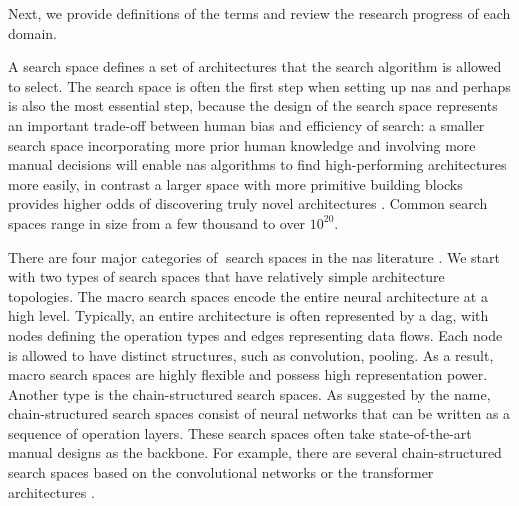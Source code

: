 \documentclass[a4paper,oneside,bibliography=totoc]{scrbook}
\begin{document}
\noindent Next, we provide definitions of the terms and review the research progress of each domain.
\begin{description}[leftmargin=0cm, listparindent=\parindent]
	\item [Search Space] A search space defines a set of architectures that the search algorithm is allowed to select. The search space is often the first step when setting up \gls{nas} and perhaps is also the most essential step, because
		the design of the search space represents an important trade-off between human bias and efficiency of search: a
		smaller search space incorporating more prior human knowledge and involving more manual decisions will enable
		\gls{nas} algorithms to find high-performing architectures more easily, in contrast a larger space with more primitive
		building blocks provides higher odds of discovering truly novel architectures \cite{white2023survey}. Common  search
		spaces range in size from a few thousand to over $10^{20}$.	
	
		There are four major categories of search spaces in the \gls{nas} literature \cite{white2023survey}. We start with two types of search spaces that have relatively simple architecture topologies. The macro search spaces \cite{baker2017designing, kandasamy2018neural, zoph2017neural} encode the entire neural architecture at a high level. Typically, an entire architecture is often represented by a \gls{dag}, with nodes defining the operation types and edges representing data flows. Each node is allowed to have distinct structures, such as convolution, pooling. As a result, macro search  spaces are highly flexible and possess high representation power. Another type is the chain-structured search spaces. As suggested by the name, chain-structured search spaces consist of neural networks that can be written as a sequence of operation layers. These search spaces often take state-of-the-art manual designs as the backbone. For example, there are several chain-structured search spaces based on the convolutional networks \cite{cai2018proxylessnas} or the transformer architectures \cite{xu2021nasbert}. 
		

\end{description}
\end{document}
